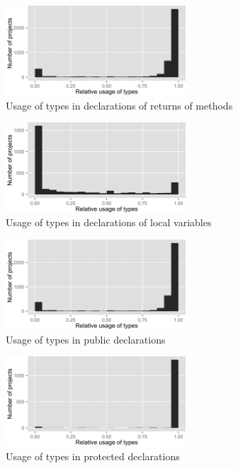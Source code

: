 \begin{figure}[h]
\centering 
\includegraphics[width=0.6\textwidth]{../aosd_2014/analysis/result/test/test/histograms/7_Method_Return.png} 
\caption{Usage of types in declarations of returns of methods}
\end{figure}

\begin{figure}[h]
\centering 
\includegraphics[width=0.6\textwidth]{../aosd_2014/analysis/result/test/test/histograms/6_Local_Variable.png} 
\caption{Usage of types in declarations of local variables}
\end{figure}

\begin{figure}[h]
\centering 
\includegraphics[width=0.6\textwidth]{../aosd_2014/analysis/result/test/test/histograms/13_Public.png} 
\caption{Usage of types in public declarations}
\end{figure}

\begin{figure}[h]
\centering 
\includegraphics[width=0.6\textwidth]{../aosd_2014/analysis/result/test/test/histograms/12_Protected.png} 
\caption{Usage of types in protected declarations}
\end{figure}

